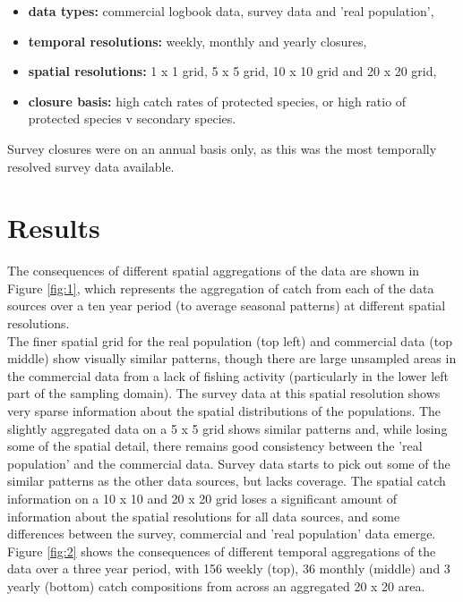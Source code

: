 \documentclass[review]{elsarticle}
\begin{document}
\begin{itemize}
	\item \textbf{data types:} commercial logbook data, survey data and
		'real population',
	\item \textbf{temporal resolutions:} weekly, monthly and yearly
		closures,
	\item \textbf{spatial resolutions:} 1 x 1 grid, 5 x 5 grid, 10 x 10
		grid and 20 x 20 grid,
	\item \textbf{closure basis:} high catch rates of protected species, or
		high ratio of protected species v secondary species.
\end{itemize}

Survey closures were on an annual basis only, as this was the most temporally
resolved survey data available.

\section{Results}

The consequences of different spatial aggregations of the data are shown in
Figure \ref{fig:1}, which represents the aggregation of catch from each of the
data sources over a ten year period (to average seasonal patterns) at different
spatial resolutions. \\

The finer spatial grid for the real population (top left) and commercial data
(top middle) show visually similar patterns, though there are large unsampled
areas in the commercial data from a lack of fishing activity (particularly in
the lower left part of the sampling domain). The survey data at this spatial
resolution shows very sparse information about the spatial distributions of the
populations. The slightly aggregated data on a 5 x 5 grid shows similar
patterns and, while losing some of the spatial detail, there remains good
consistency between the 'real population' and the commercial data. Survey data
starts to pick out some of the similar patterns as the other data sources, but
lacks coverage. The spatial catch information on a 10 x 10 and 20 x 20 grid
loses a significant amount of information about the spatial resolutions for all
data sources, and some differences between the survey, commercial and 'real
population' data emerge. \\

Figure \ref{fig:2} shows the consequences of different temporal aggregations of
the data over a three year period, with 156 weekly (top), 36 monthly (middle)
and 3 yearly (bottom) catch compositions from across an aggregated 20 x 20
area. \\
\end{document}
